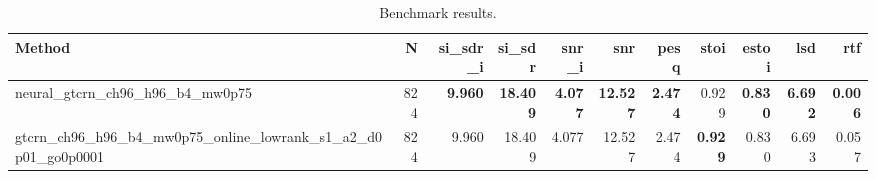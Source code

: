 \begin{table}[t]
\centering
\caption{Benchmark results.}
\label{tab:bench}
\begin{tabular}{lrrrrrrrrrr}
\toprule
Method & N & si\_sdr\_i & si\_sdr & snr\_i & snr & pesq & stoi & estoi & lsd & rtf \\
\midrule
neural_gtcrn_ch96_h96_b4_mw0p75 & 824 & \textbf{9.960} & \textbf{18.409} & \textbf{4.077} & \textbf{12.527} & \textbf{2.474} & 0.929 & \textbf{0.830} & \textbf{6.692} & \textbf{0.006} \\
gtcrn_ch96_h96_b4_mw0p75_online_lowrank_s1_a2_d0p01_go0p0001 & 824 & 9.960 & 18.409 & 4.077 & 12.527 & 2.474 & \textbf{0.929} & 0.830 & 6.693 & 0.057 \\
\bottomrule
\end{tabular}
\end{table}